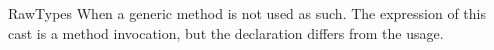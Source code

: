 \begin{pattern}{RawTypes}
When a generic method is not used as such.
The expression of this cast is a method invocation,
but the declaration differs from the usage.

\instances

\end{pattern}